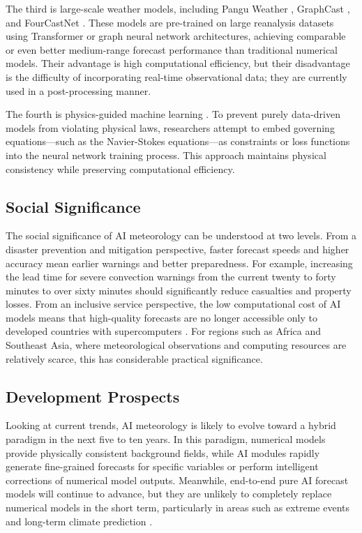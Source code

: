 \documentclass{article}
\begin{document}
The third is large-scale weather models, including Pangu Weather \cite{Bi2022}, GraphCast \cite{Lam2023}, and FourCastNet \cite{Pathak2022FourCastNet}. These models are pre-trained on large reanalysis datasets using Transformer or graph neural network architectures, achieving comparable or even better medium-range forecast performance than traditional numerical models. Their advantage is high computational efficiency, but their disadvantage is the difficulty of incorporating real-time observational data; they are currently used in a post-processing manner.

The fourth is physics-guided machine learning \cite{Kashinath2021Physics}. To prevent purely data-driven models from violating physical laws, researchers attempt to embed governing equations—such as the Navier-Stokes equations—as constraints or loss functions into the neural network training process. This approach maintains physical consistency while preserving computational efficiency.

\subsection{Social Significance}

The social significance of AI meteorology can be understood at two levels. From a disaster prevention and mitigation perspective, faster forecast speeds and higher accuracy mean earlier warnings and better preparedness. For example, increasing the lead time for severe convection warnings from the current twenty to forty minutes to over sixty minutes should significantly reduce casualties and property losses. From an inclusive service perspective, the low computational cost of AI models means that high-quality forecasts are no longer accessible only to developed countries with supercomputers \cite{WMO2021Smart}. For regions such as Africa and Southeast Asia, where meteorological observations and computing resources are relatively scarce, this has considerable practical significance.

\subsection{Development Prospects}

Looking at current trends, AI meteorology is likely to evolve toward a hybrid paradigm in the next five to ten years. In this paradigm, numerical models provide physically consistent background fields, while AI modules rapidly generate fine-grained forecasts for specific variables or perform intelligent corrections of numerical model outputs. Meanwhile, end-to-end pure AI forecast models will continue to advance, but they are unlikely to completely replace numerical models in the short term, particularly in areas such as extreme events and long-term climate prediction \cite{Schultz2021Can}.
\end{document}
